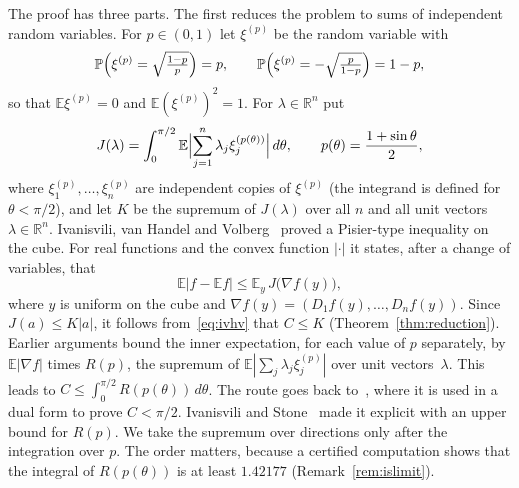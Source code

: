 \documentclass[11pt]{amsart}
\theoremstyle{remark}
\numberwithin{equation}{section}
\newcommand{\R}{\mathbb{R}}
\newcommand{\E}{\mathbb{E}}
\renewcommand{\P}{\mathbb{P}}
\newcommand{\ISLimitLo}{1.42177}
\begin{document}
The proof has three parts. The first reduces the problem to sums of independent random variables. For $p\in(0,1)$ let $\xi^{(p)}$ be the random variable with
\begin{equation}\label{eq:xi}
\P\Bigl(\xi^{(p)}=\sqrt{\tfrac{1-p}{p}}\Bigr)=p,\qquad \P\Bigl(\xi^{(p)}=-\sqrt{\tfrac{p}{1-p}}\Bigr)=1-p,
\end{equation}
so that $\E\xi^{(p)}=0$ and $\E(\xi^{(p)})^2=1$. For $\lambda\in\R^n$ put
\begin{equation}\label{eq:J}
J(\lambda)=\int_0^{\pi/2}\E\Bigl|\sum_{j=1}^n\lambda_j\xi_j^{(p(\theta))}\Bigr|\,d\theta,\qquad p(\theta)=\frac{1+\sin\theta}{2},
\end{equation}
where $\xi_1^{(p)},\dots,\xi_n^{(p)}$ are independent copies of $\xi^{(p)}$ (the integrand is defined for $\theta<\pi/2$), and let $K$ be the supremum of $J(\lambda)$ over all $n$ and all unit vectors $\lambda\in\R^n$. Ivanisvili, van Handel and Volberg~\cite[Theorem~1.2]{IvHV} proved a Pisier-type inequality on the cube. For real functions and the convex function $|\cdot|$ it states, after a change of variables, that
\begin{equation}\label{eq:ivhv}
\E|f-\E f|\le\E_y\,J\bigl(\nabla f(y)\bigr),
\end{equation}
where $y$ is uniform on the cube and $\nabla f(y)=(D_1f(y),\dots,D_nf(y))$. Since $J(a)\le K|a|$, it follows from~\eqref{eq:ivhv} that $C\le K$ (Theorem~\ref{thm:reduction}). Earlier arguments bound the inner expectation, for each value of $p$ separately, by $\E|\nabla f|$ times $R(p)$, the supremum of $\E|\sum_j\lambda_j\xi_j^{(p)}|$ over unit vectors~$\lambda$. This leads to $C\le\int_0^{\pi/2}R(p(\theta))\,d\theta$. The route goes back to~\cite[Sections~2--5]{ILvHV}, where it is used in a dual form to prove $C<\pi/2$. Ivanisvili and Stone~\cite[Section~2.4]{IS24} made it explicit with an upper bound for $R(p)$. We take the supremum over directions only after the integration over $p$. The order matters, because a certified computation shows that the integral of $R(p(\theta))$ is at least $\ISLimitLo$ (Remark~\ref{rem:islimit}).
\end{document}
